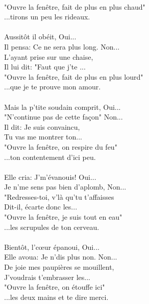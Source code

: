 \\"Ouvre la fenêtre, fait de plus en plus chaud"
\\...tirons un peu les rideaux.
\breakpage
\\\\Aussitôt il obéit, Oui...
\\Il pensa: Ce ne sera plus long. Non...
\\L'ayant prise sur une chaise,
\\Il lui dit: "Faut que j'te ...
\\"Ouvre la fenêtre, fait de plus en plus lourd"
\\...que je te prouve mon amour.
\\\\Mais la p'tite soudain comprit, Oui...
\\"N'continue pas de cette façon" Non...
\\Il dit: Je suis convaincu,
\\Tu vas me montrer ton...
\\"Ouvre la fenêtre, on respire du feu"
\\...ton contentement d'ici peu.
\\\\Elle cria: J'm'évanouis! Oui...
\\Je n'me sens pas bien d'aplomb, Non...
\\"Redresses-toi, v'là qu'tu t'affaisses
\\Dit-il, écarte donc les...
\\"Ouvre la fenêtre, je suis tout en eau"
\\...les scrupules de ton cerveau.
\\\\Bientôt, l'cœur épanoui, Oui...
\\Elle avoua: Je n'dis plus non. Non...
\\De joie mes paupières se mouillent,
\\J'voudrais t'embrasser les...
\\"Ouvre la fenêtre, on étouffe ici"
\\...les deux mains et te dire merci.

\breakpage